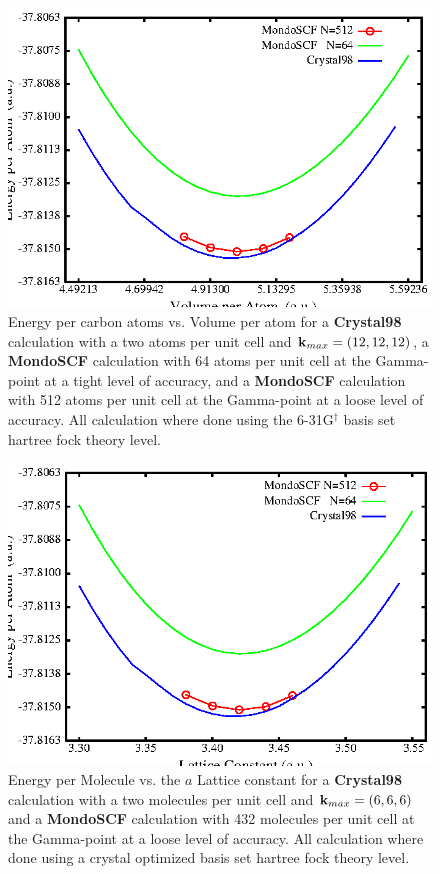 \documentclass[prb,aps,nobibnotes,twocolumn,doublespace,twocolumngrid,superbib]{revtex4}
\begin{document}
%
%
%
\begin{figure}
\caption{Energy per carbon atoms vs. Volume per atom  for a {\bf Crystal98} calculation 
with a two atoms per unit
cell and ${\bf k}_{max} = (12,12,12)$, a {\bf MondoSCF} calculation with 64 atoms per
unit cell at the Gamma-point at a tight level of accuracy, and a {\bf MondoSCF} calculation 
with 512 atoms  per
unit cell at the Gamma-point at a loose level of accuracy.
All calculation where done using the 
6-31G$ ^\dagger$ basis set hartree fock theory level. }
\label{figure:EnergyVsLattice}
{\centering \includegraphics{Diamond_En_vs_a.ps} \par} 
\end{figure}
%
%
%
\begin{figure}
\caption{Energy per Molecule vs. the $a$ Lattice constant for a {\bf Crystal98} calculation 
with a two molecules per unit cell and ${\bf k}_{max} = (6,6,6)$ and a {\bf MondoSCF} calculation 
with 432 molecules  per unit cell at the Gamma-point at a loose level of accuracy.
All calculation where done using a crystal optimized basis set\cite{CBS:511G:H,CBS:861G:MgO} 
hartree fock theory level. }
\label{figure:EnergyVsLattice_Ice}
{\centering \includegraphics{pIce_En_vs_a.ps} \par} 
\end{figure}
%
%
%
%
\end{document}

